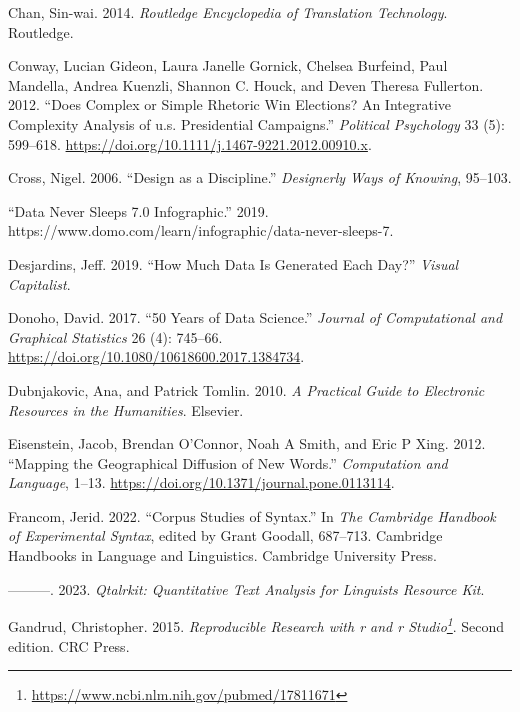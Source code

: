 \documentclass[
  letterpaper,
  DIV=11,
  numbers=noendperiod]{scrreport}
\newlength{\cslhangindent}
\newlength{\cslentryspacingunit} %
\newenvironment{CSLReferences}[2] %
 {%
  \setlength{\parindent}{0pt}
  \ifodd #1
  \let\oldpar\par
  \def\par{\hangindent=\cslhangindent\oldpar}
  \fi
  \setlength{\parskip}{#2\cslentryspacingunit}
 }%
 {}
\theoremstyle{definition}
\theoremstyle{remark}
\DeclareRobustCommand{\href}[2]{#2\footnote{\url{#1}}}
\begin{document}
\begin{CSLReferences}{1}{0}
\leavevmode{}%
Chan, Sin-wai. 2014. \emph{Routledge Encyclopedia of Translation
Technology}. Routledge.

\leavevmode{}%
Conway, Lucian Gideon, Laura Janelle Gornick, Chelsea Burfeind, Paul
Mandella, Andrea Kuenzli, Shannon C. Houck, and Deven Theresa Fullerton.
2012. {``Does Complex or Simple Rhetoric Win Elections? An Integrative
Complexity Analysis of u.s. Presidential Campaigns.''} \emph{Political
Psychology} 33 (5): 599--618.
\url{https://doi.org/10.1111/j.1467-9221.2012.00910.x}.

\leavevmode{}%
Cross, Nigel. 2006. {``Design as a Discipline.''} \emph{Designerly Ways
of Knowing}, 95--103.

\leavevmode{}%
{``Data Never Sleeps 7.0 Infographic.''} 2019.
https://www.domo.com/learn/infographic/data-never-sleeps-7.

\leavevmode{}%
Desjardins, Jeff. 2019. {``How Much Data Is Generated Each Day?''}
\emph{Visual Capitalist}.

\leavevmode{}%
Donoho, David. 2017. {``50 Years of Data Science.''} \emph{Journal of
Computational and Graphical Statistics} 26 (4): 745--66.
\url{https://doi.org/10.1080/10618600.2017.1384734}.

\leavevmode{}%
Dubnjakovic, Ana, and Patrick Tomlin. 2010. \emph{A Practical Guide to
Electronic Resources in the Humanities}. Elsevier.

\leavevmode{}%
Eisenstein, Jacob, Brendan O'Connor, Noah A Smith, and Eric P Xing.
2012. {``Mapping the Geographical Diffusion of New Words.''}
\emph{Computation and Language}, 1--13.
\url{https://doi.org/10.1371/journal.pone.0113114}.

\leavevmode{}%
Francom, Jerid. 2022. {``Corpus Studies of Syntax.''} In \emph{The
Cambridge Handbook of Experimental Syntax}, edited by Grant Goodall,
687--713. Cambridge Handbooks in Language and Linguistics. Cambridge
University Press.

\leavevmode{}%
---------. 2023. \emph{Qtalrkit: Quantitative Text Analysis for
Linguists Resource Kit}.

\leavevmode{}%
Gandrud, Christopher. 2015.
\emph{\href{https://www.ncbi.nlm.nih.gov/pubmed/17811671}{Reproducible
Research with r and r Studio}}. Second edition. CRC Press.


\end{CSLReferences}
\end{document}

